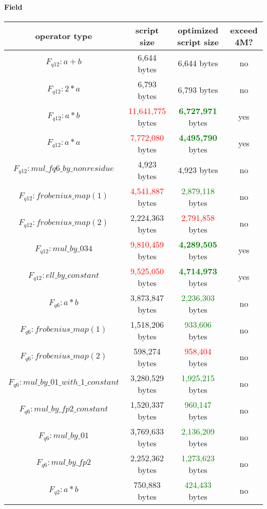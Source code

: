 \paragraph*{Field}

\begin{center}
\begin{tabular}{|c|c|c|c|} \hline
operator type & script size & optimized script size & exceed 4M? \\ \hline
$F_{q12}: a + b$ & 6,644 bytes & 6,644 bytes & no  \\ \hline
$F_{q12}: 2 * a$ & 6,793 bytes & 6,793 bytes & no \\ \hline
$F_{q12}: a * b$ & \textcolor{red}{11,641,775} bytes & \textcolor{green}{\textbf{6,727,971}} bytes & yes \\ \hline
$F_{q12}: a * a$ & \textcolor{red}{7,772,080} bytes & \textcolor{green}{\textbf{4,495,790}} bytes & yes \\ \hline
$F_{q12}: mul\_fq6\_by\_nonresidue$ & 4,923 bytes & 4,923 bytes & no \\ \hline
$F_{q12}: frobenius\_map(1)$ & \textcolor{red}{4,541,887} bytes & \textcolor{green}{2,879,118} bytes & no \\ \hline
$F_{q12}: frobenius\_map(2)$ & 2,224,363 bytes & \textcolor{red}{2,791,858} bytes  & no \\ \hline
$F_{q12}: mul\_by\_034$ & \textcolor{red}{9,810,459} bytes & \textcolor{green}{\textbf{4,289,505}} bytes & yes \\ \hline
$F_{q12}: ell\_by\_constant$ & \textcolor{red}{9,525,050} bytes & \textcolor{green}{\textbf{4,714,973}} bytes  & yes \\ \hline
$F_{q6}: a * b$ & 3,873,847 bytes & \textcolor{green}{2,236,303} bytes & no \\ \hline
$F_{q6}: frobenius\_map(1)$ & 1,518,206 bytes & \textcolor{green}{933,606} bytes & no \\ \hline
$F_{q6}: frobenius\_map(2)$ & 598,274 bytes & \textcolor{red}{958,404} bytes & no \\ \hline
$F_{q6}: mul\_by\_01\_with\_1\_constant$ & 3,280,529 bytes & \textcolor{green}{1,925,215} bytes & no \\ \hline
$F_{q6}: mul\_by\_fp2\_constant$ &  1,520,337 bytes & \textcolor{green}{960,147} bytes & no \\ \hline
$F_{q6}: mul\_by\_01$ & 3,769,633 bytes & \textcolor{green}{2,136,209} bytes & no \\ \hline
$F_{q6}: mul\_by\_fp2$ & 2,252,362 bytes & \textcolor{green}{1,273,623} bytes & no \\ \hline
$F_{q2}: a * b$ & 750,883 bytes & \textcolor{green}{424,433} bytes & no \\ \hline

\end{tabular}
\end{center}
